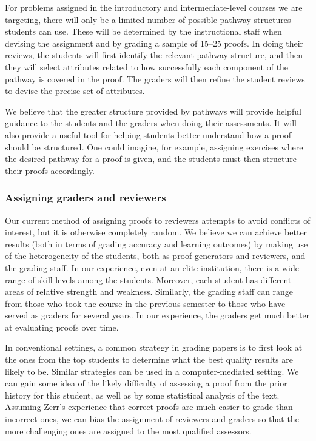 \documentclass[12pt]{article}
\begin{document}
For problems assigned in the introductory and intermediate-level
courses we are targeting, there will only be a limited number of
possible pathway structures students can use.  These will be
determined by the instructional staff when devising the assignment and
by grading a sample of 15--25 proofs.  In doing their reviews, the
students will first identify the relevant pathway structure, and then
they will select attributes related to how successfully each component
of the pathway is covered in the proof.  The graders will then refine
the student reviews to devise the precise set of attributes.

We believe that the greater structure provided by pathways will
provide helpful guidance to the students and the graders when doing
their assessments.  It will also provide a useful tool for helping
students better understand how a proof should be structured.  One
could imagine, for example, assigning exercises where the
desired pathway for a proof is given, and the students must
then structure their proofs accordingly.

\subsubsection*{Assigning graders and reviewers}

Our current method of assigning proofs to reviewers attempts to avoid
conflicts of interest, but it is otherwise completely random.  We
believe we can achieve better results (both in terms of grading accuracy and learning outcomes) by making use of the
heterogeneity of the students, both as proof generators and reviewers,
and the grading staff.  In our experience, even at an elite
institution, there is a wide range of skill levels among the students.
Moreover, each student has different areas of relative strength and
weakness.  Similarly, the grading staff can range from those who took
the course in the previous semester to those who have served as
graders for several years.  In our experience, the graders get much
better at evaluating proofs over time.

In conventional settings, a common strategy in grading papers is to
first look at the ones from the top students to determine what the
best quality results are likely to be.  Similar strategies can be used
in a computer-mediated setting.  We can gain some idea of the likely
difficulty of assessing a proof from the prior history for this
student, as well as by some statistical analysis of the text.
Assuming Zerr's experience that correct proofs are much easier to
grade than incorrect ones, we can bias the assignment of reviewers and
graders so that the more challenging ones are assigned to the most
qualified assessors.
\end{document}
